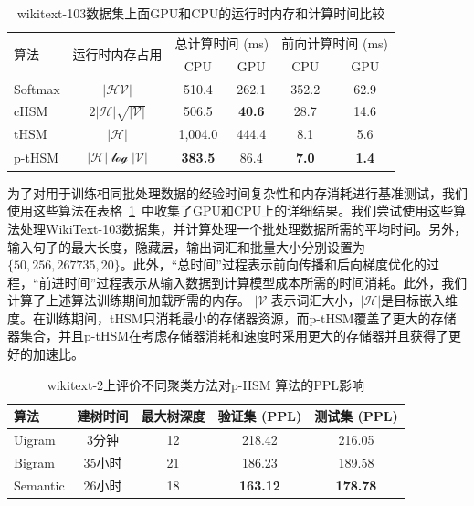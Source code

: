 \begin{table}[!ht]
  \centering
  \caption{wikitext-103数据集上面GPU和CPU的运行时内存和计算时间比较\label{tab:time}}
\begin{tabular}{lccccc}
  \toprule
 \multirow{2}{*}{算法}  &\multirow{2}{*}{运行时内存占用} &\multicolumn{2}{c}{总计算时间 (ms)} & \multicolumn{2}{c}{前向计算时间 (ms)}   \\
   \cmidrule(lr){3-4}  \cmidrule(lr){5-6}
	& & CPU&GPU & CPU& GPU \\ \midrule
Softmax & $\mathcal{|HV|}$ &510.4  &262.1&352.2& 62.9 \\
cHSM    & $2\mathcal{|H|\sqrt{|V|}}$&506.5  &\textbf{40.6}&28.7&14.6 \\
tHSM    &$\mathcal{|H|}$&1,004.0 &444.4 & 8.1&  5.6   \\
p-tHSM  &$\mathcal{|H|\log{|V|}}$ &\textbf{383.5}&	86.4 &\textbf{7.0}&	\textbf{1.4} \\
  \bottomrule
\end{tabular}
\end{table}


为了对用于训练相同批处理数据的经验时间复杂性和内存消耗进行基准测试，我们使用这些算法在表格~\ref{tab:time}~中收集了GPU和CPU上的详细结果。我们尝试使用这些算法处理WikiText-103数据集，并计算处理一个批处理数据所需的平均时间。另外，输入句子的最大长度，隐藏层，输出词汇和批量大小分别设置为$\{50, 256, 267735, 20\}$。此外，“总时间”过程表示前向传播和后向梯度优化的过程，“前进时间”过程表示从输入数据到计算模型成本所需的时间消耗。此外，我们计算了上述算法训练期间加载所需的内存。 $ \mathcal{| V |} $表示词汇大小，$ \mathcal{| H |} $是目标嵌入维度。在训练期间，tHSM只消耗最小的存储器资源，而p-tHSM覆盖了更大的存储器集合，并且p-tHSM在考虑存储器消耗和速度时采用更大的存储器并且获得了更好的加速比。

\begin{table}[!ht]
  \centering
   \caption{wikitext-2上评价不同聚类方法对p-HSM 算法的PPL影响\label{table:p-thsm}}
  \begin{tabular}{lcccc} \toprule
  算法  &建树时间&最大树深度 &验证集 (PPL) & 测试集 (PPL)  \\ \midrule
  Uigram  &3分钟&12 &218.42& 216.05     \\
  Bigram  &35小时&21& 186.23& 189.58\\
  Semantic &26小时 &18& \textbf{163.12} & \textbf{178.78}\\
\bottomrule
  \end{tabular}
\end{table}

